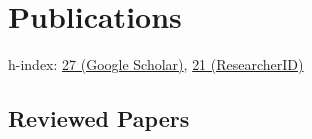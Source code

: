 \documentclass{article}
\begin{document}

\section*{Publications}

h-index: \href{http://scholar.google.com/citations?user=nwPxp24AAAAJ}{27 (Google Scholar)}, \href{https://www.webofscience.com/wos/author/record/G-4238-2010}{21 (ResearcherID)}

\subsection*{Reviewed Papers}
\end{document}
